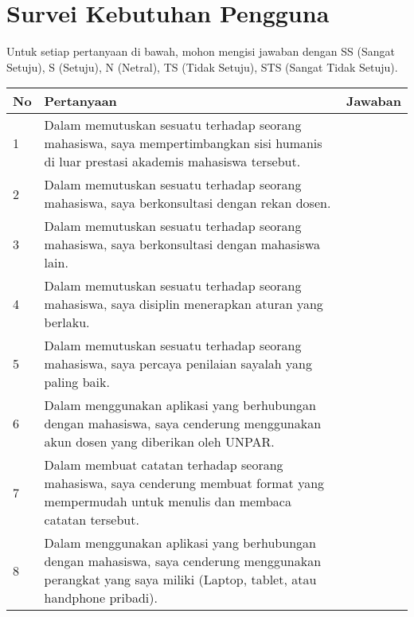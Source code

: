 \chapter{Survei Kebutuhan Pengguna}
\label{surveikebutuhanpengguna}

Untuk setiap pertanyaan di bawah, mohon mengisi jawaban dengan SS (Sangat Setuju), S (Setuju), N (Netral), TS (Tidak Setuju), STS (Sangat Tidak Setuju).

\begin{table}[h]
\centering
\begin{tabular}{|l|p{10cm}|l|}
\hline
No & Pertanyaan                                                                                                                                                    & Jawaban \\ \hline
1  & Dalam memutuskan sesuatu terhadap seorang mahasiswa, saya mempertimbangkan sisi humanis di luar prestasi akademis mahasiswa tersebut.                         &         \\ \hline
2  & Dalam memutuskan sesuatu terhadap seorang mahasiswa, saya berkonsultasi dengan rekan dosen.                                                                   &         \\ \hline
3  & Dalam memutuskan sesuatu terhadap seorang mahasiswa, saya berkonsultasi dengan mahasiswa lain.                                                                &         \\ \hline
4  & Dalam memutuskan sesuatu terhadap seorang mahasiswa, saya disiplin menerapkan aturan yang berlaku.                                                            &         \\ \hline
5  & Dalam memutuskan sesuatu terhadap seorang mahasiswa, saya percaya penilaian sayalah yang paling baik.                                                         &         \\ \hline
6  & Dalam menggunakan aplikasi yang berhubungan dengan mahasiswa, saya cenderung menggunakan akun dosen yang diberikan oleh UNPAR.                                 &         \\ \hline
7  & Dalam membuat catatan terhadap seorang mahasiswa, saya cenderung membuat format yang mempermudah untuk menulis dan membaca catatan tersebut.                  &         \\ \hline
8  & Dalam menggunakan aplikasi yang berhubungan dengan mahasiswa, saya cenderung menggunakan perangkat yang saya miliki (Laptop, tablet, atau handphone pribadi). &         \\ \hline
\end{tabular}
\end{table}
